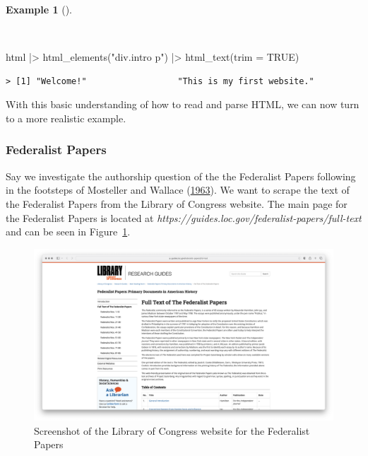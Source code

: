 \documentclass[
  letterpaper,
  DIV=11,
  numbers=noendperiod]{scrreport}
\newenvironment{Shaded}{\begin{snugshade}}{\end{snugshade}}
\newcommand{\AttributeTok}[1]{\textcolor[rgb]{0.00,0.00,0.00}{#1}}
\newcommand{\ConstantTok}[1]{\textcolor[rgb]{0.00,0.00,0.00}{#1}}
\newcommand{\FunctionTok}[1]{\textcolor[rgb]{0.00,0.00,0.00}{#1}}
\newcommand{\NormalTok}[1]{\textcolor[rgb]{0.00,0.00,0.00}{#1}}
\newcommand{\SpecialCharTok}[1]{\textcolor[rgb]{0.00,0.00,0.00}{#1}}
\newcommand{\StringTok}[1]{\textcolor[rgb]{0.00,0.00,0.00}{#1}}
\theoremstyle{definition}
\newtheorem{example}{Example}[chapter]
\theoremstyle{remark}
\begin{document}
\begin{example}[]\protect\hypertarget{exm-ad-parse-html-toy-5}{}\label{exm-ad-parse-html-toy-5}

~

\begin{Shaded}
\begin{Highlighting}[]
\NormalTok{html }\SpecialCharTok{|\textgreater{}}
  \FunctionTok{html\_elements}\NormalTok{(}\StringTok{"div.intro p"}\NormalTok{) }\SpecialCharTok{|\textgreater{}}
  \FunctionTok{html\_text}\NormalTok{(}\AttributeTok{trim =} \ConstantTok{TRUE}\NormalTok{)}
\end{Highlighting}
\end{Shaded}

\begin{verbatim}
> [1] "Welcome!"                  "This is my first website."
\end{verbatim}

\end{example}

With this basic understanding of how to read and parse HTML, we can now
turn to a more realistic example.

\hypertarget{federalist-papers}{%
\subsubsection{Federalist Papers}\label{federalist-papers}}

Say we investigate the authorship question of the the Federalist Papers
following in the footsteps of Mosteller and Wallace
(\protect\hyperlink{ref-Mosteller1963}{1963}). We want to scrape the
text of the Federalist Papers from the Library of Congress website. The
main page for the Federalist Papers is located at
\emph{https://guides.loc.gov/federalist-papers/full-text} and can be
seen in Figure~\ref{fig-ad-web-scrape-screenshot}.

\begin{figure}[H]

{\centering \includegraphics[width=1\textwidth,height=\textheight]{figures/acquire-data/ad-fed-papers-loc-main.png}

}

\caption{\label{fig-ad-web-scrape-screenshot}Screenshot of the Library
of Congress website for the Federalist Papers}

\end{figure}
\end{document}
